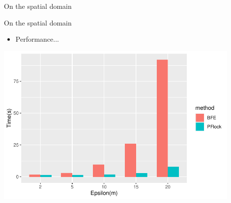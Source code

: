 \documentclass{beamer}
\begin{document}
\begin{frame}{On the spatial domain}
\begin{figure}
\begin{subfigure}[t]{0.32\textwidth}
            \end{subfigure}
        \end{figure}
    \end{frame}

    \begin{frame}{On the spatial domain}
        \begin{itemize} \item Performance... \end{itemize} \vspace{0.5cm}

        \centering
        \includegraphics[width=0.9\textwidth]{figures/R/MF/PFlockVsBFE2.pdf}
    \end{frame}
\end{document}
